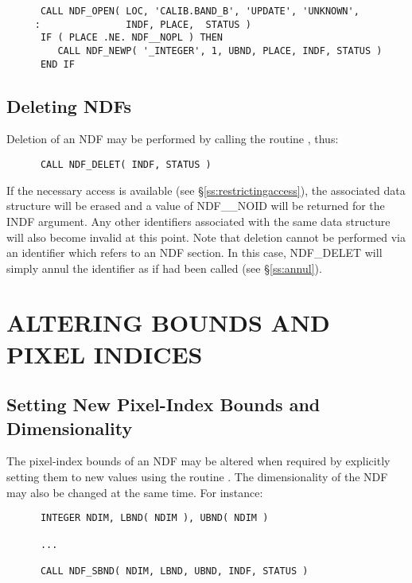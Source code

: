 \small
\begin{verbatim}
      CALL NDF_OPEN( LOC, 'CALIB.BAND_B', 'UPDATE', 'UNKNOWN',
     :               INDF, PLACE,  STATUS )
      IF ( PLACE .NE. NDF__NOPL ) THEN
         CALL NDF_NEWP( '_INTEGER', 1, UBND, PLACE, INDF, STATUS )
      END IF
\end{verbatim}
\normalsize

\subsection{\label{ss:delet}Deleting NDFs}

Deletion of an NDF may be performed by calling the routine , thus:

\small
\begin{verbatim}
      CALL NDF_DELET( INDF, STATUS )
\end{verbatim}
\normalsize

If the necessary access is available (see \S\ref{ss:restrictingaccess}), the
associated data structure will be erased and a value of NDF\_\_NOID will be
returned for the INDF argument. 
Any other identifiers associated with the same data structure will also become
invalid at this point.
Note that deletion cannot be performed via an identifier which refers to an 
NDF section.
In this case, NDF\_DELET will simply annul the identifier as if  
had been called (see \S\ref{ss:annul}).


\section{ALTERING BOUNDS AND PIXEL INDICES}

\subsection{\label{ss:sbnd}Setting New Pixel-Index Bounds and Dimensionality}

The pixel-index bounds of an NDF may be altered when required by explicitly
setting them to new values using the routine . 
The dimensionality of the NDF may also be changed at the same time. 
For instance:

\small
\begin{verbatim}
      INTEGER NDIM, LBND( NDIM ), UBND( NDIM )

      ...

      CALL NDF_SBND( NDIM, LBND, UBND, INDF, STATUS )
\end{verbatim}
\normalsize

